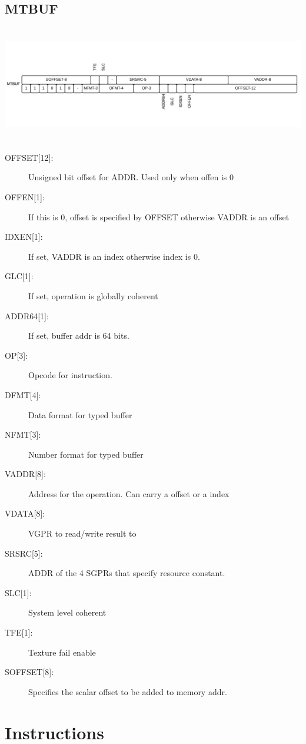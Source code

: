 \documentclass{article}
\begin{document}
\subsection{MTBUF}
\includegraphics[width=7in, height=2in]{mtbuf.png} \\
\begin{description}
  \item[{OFFSET[12]:}] Unsigned bit offset for ADDR. Used only when offen is 0
  \item [{OFFEN[1]:}] If this is 0, offset is specified by OFFSET otherwise VADDR is an offset
  \item [{IDXEN[1]:}] If set, VADDR is an index otherwise index is 0.
  \item [{GLC[1]:}] If set, operation is globally coherent
  \item [{ADDR64[1]:}] If set, buffer addr is 64 bits.
  \item [{OP[3]:}] Opcode for instruction.
  \item [{DFMT[4]:}] Data format for typed buffer
  \item [{NFMT[3]:}] Number format for typed buffer
  \item [{VADDR[8]:}] Address for the operation. Can carry a offset or a index
  \item [{VDATA[8]:}] VGPR to read/write result to
  \item [{SRSRC[5]:}] ADDR of the 4 SGPRs that specify resource constant.
  \item [{SLC[1]:}] System level coherent
  \item [{TFE[1]:}] Texture fail enable
  \item [{SOFFSET[8]:}] Specifies the scalar offset to be added to memory addr.
\end{description}

\section{Instructions}
\end{document}
